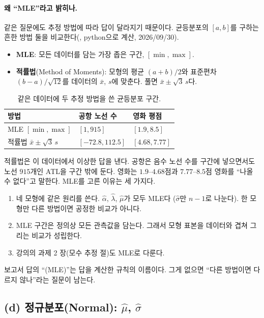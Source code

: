 \documentclass[11pt]{article}
\newcommand{\term}[1]{\textbf{#1}}
\begin{document}
\paragraph{왜 ``MLE''라고 밝히나.} 같은 질문에도 추정 방법에 따라 답이 달라지기 때문이다.
균등분포의 $[a, b]$를 구하는 흔한 방법 둘을 비교한다(,
python으로 계산, 2026/09/30).
\begin{itemize}
  \item \term{MLE}: 모든 데이터를 담는 가장 좁은 구간, $[\min, \max]$.
  \item \term{적률법}(Method of Moments): 모형의 평균 $(a+b)/2$와 표준편차
        $(b-a)/\sqrt{12}$를 데이터의 $\bar x$, $s$에 맞춘다. 풀면 $\bar x \pm \sqrt{3}\,s$다.
\end{itemize}
\begin{table}[H]
  \centering
  \caption{같은 데이터에 두 추정 방법을 쓴 균등분포 구간.}
  \label{tab:uniform-mom}
  \begin{tabular}{lll}
    \toprule
    방법 & 공항 노선 수 & 영화 평점 \\
    \midrule
    MLE $[\min, \max]$ & $[1, 915]$ & $[1.9, 8.5]$ \\
    \midrule
    적률법 $\bar x \pm \sqrt3\,s$ & $[-72.8, 112.5]$ & $[4.68, 7.77]$ \\
    \bottomrule
  \end{tabular}
\end{table}
적률법은 이 데이터에서 이상한 답을 낸다. 공항은 음수 노선 수를 구간에 넣으면서도
노선 $915$개인 ATL을 구간 밖에 둔다. 영화는 $1.9$--$4.68$점과 $7.77$--$8.5$점 영화를
``나올 수 없다''고 말한다. MLE를 고른 이유는 세 가지다.
\begin{enumerate}
  \item 네 모형에 같은 원리를 쓴다. $\hat\alpha$, $\hat\lambda$, $\hat\mu$가 모두 MLE다
        ($\hat\sigma$만 $n-1$로 나눈다). 한 모형만 다른 방법이면 공정한 비교가 아니다.
  \item MLE 구간은 정의상 모든 관측값을 담는다. 그래서 모형 표본을 데이터와 겹쳐 그리는
        비교가 성립한다.
  \item 강의의 과제 2 장(모수 추정 절)도 MLE로 다룬다.
\end{enumerate}
보고서 답의 ``(MLE)''는 답을 계산한 규칙의 이름이다. 그게 없으면 ``다른 방법이면
다르지 않나''라는 질문이 남는다.

\subsection{(d) 정규분포(Normal): $\hat\mu$, $\hat\sigma$}
\end{document}
